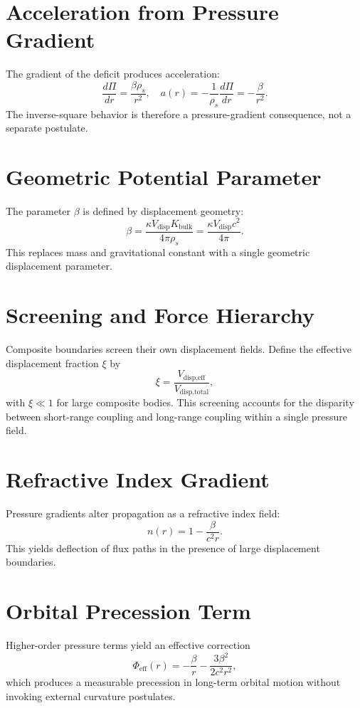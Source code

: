 \documentclass[12pt]{book}
\begin{document}
\section{Acceleration from Pressure Gradient}
The gradient of the deficit produces acceleration:
\begin{equation}
\frac{d\Pi}{dr} = \frac{\beta \rho_s}{r^2},\quad
a(r) = -\frac{1}{\rho_s}\frac{d\Pi}{dr} = -\frac{\beta}{r^2}.
\end{equation}
The inverse-square behavior is therefore a pressure-gradient consequence, not a separate postulate.

\section{Geometric Potential Parameter}
The parameter $\beta$ is defined by displacement geometry:
\begin{equation}
\beta = \frac{\kappa V_{\text{disp}} K_{\text{bulk}}}{4\pi \rho_s} = \frac{\kappa V_{\text{disp}} c^2}{4\pi}.
\end{equation}
This replaces mass and gravitational constant with a single geometric displacement parameter.

\section{Screening and Force Hierarchy}
Composite boundaries screen their own displacement fields. Define the effective displacement fraction
$\xi$ by
\begin{equation}
\xi = \frac{V_{\text{disp,eff}}}{V_{\text{disp,total}}},
\end{equation}
with $\xi \ll 1$ for large composite bodies. This screening accounts for the disparity between
short-range coupling and long-range coupling within a single pressure field.

\section{Refractive Index Gradient}
Pressure gradients alter propagation as a refractive index field:
\begin{equation}
n(r) = 1 - \frac{\beta}{c^2 r}.
\end{equation}
This yields deflection of flux paths in the presence of large displacement boundaries.

\section{Orbital Precession Term}
Higher-order pressure terms yield an effective correction
\begin{equation}
\Phi_{\text{eff}}(r) = -\frac{\beta}{r} - \frac{3\beta^2}{2c^2 r^2},
\end{equation}
which produces a measurable precession in long-term orbital motion without invoking external curvature
postulates.
\end{document}

